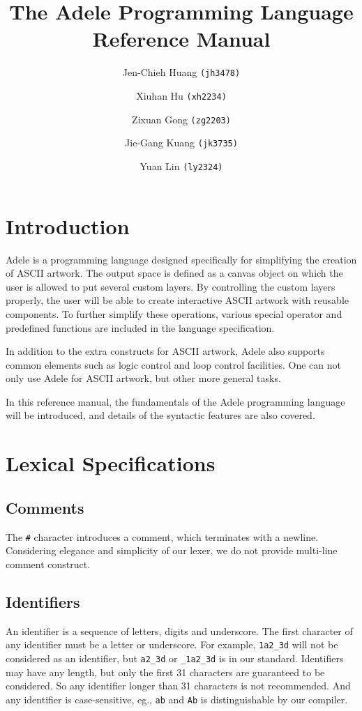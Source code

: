 \documentclass[11pt,letterpaper]{article}
\begin{document}
\title {The Adele Programming Language \\ Reference Manual}
\author {
	Jen-Chieh Huang \texttt{(jh3478)} \and Xiuhan Hu \texttt{(xh2234)} \and     
	Zixuan Gong \texttt{(zg2203)} \and Jie-Gang Kuang \texttt{(jk3735)} \and 
	Yuan Lin \texttt{(ly2324)}
}
\maketitle
\pagebreak
\begin{changemargin}{-0.5cm}{-0.5cm} 
\setcounter{tocdepth}{3}
\tableofcontents
\end{changemargin}
\pagebreak
\section {Introduction}
Adele is a programming language designed specifically for simplifying the creation of ASCII artwork. The output space is defined as a canvas object on which the user is allowed to put several custom layers. By controlling the custom layers properly, the user will be able to create interactive ASCII artwork with reusable components. To further simplify these operations, various special operator and predefined functions are included in the language specification.

In addition to the extra constructs for ASCII artwork, Adele also supports common elements such as logic control and loop control facilities. One can not only use Adele for ASCII artwork, but other more general tasks.

In this reference manual, the fundamentals of the Adele programming language will be introduced, and details of the syntactic features are also covered.

\section {Lexical Specifications}
\subsection {Comments}
The \texttt{\#} character introduces a comment, which terminates with a newline. Considering elegance and simplicity of our lexer, we do not provide multi-line comment construct. 

\subsection {Identifiers}
An identifier is a sequence of letters, digits and underscore. The first character of any identifier must be a letter or underscore. For example, \texttt {1a2\_3d} will not be considered as an identifier, but \texttt{a2\_3d} or \texttt{\_1a2\_3d} is in our standard. Identifiers may have any length, but only the first 31 characters are guaranteed to be considered. So any identifier longer than 31 characters is not recommended. And any identifier is case-sensitive, eg., \texttt{ab} and \texttt{Ab} is distinguishable by our compiler.
\end{document}
